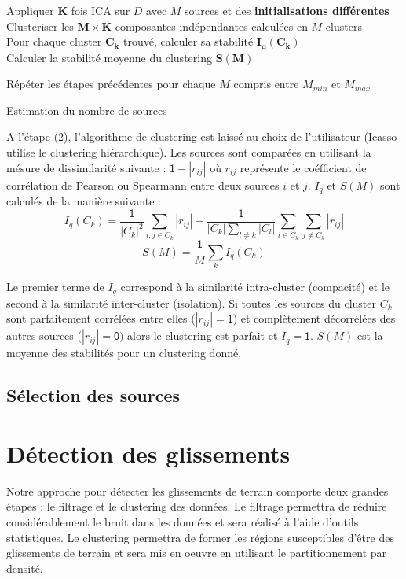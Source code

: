 \documentclass[11pt, openany]{report}
\begin{document}
\begin{algorithm}[H]
Appliquer $\boldsymbol{K}$ fois ICA sur $D$ avec $M$ sources et des \textbf{initialisations différentes} \\
Clusteriser les $\boldsymbol{M \times K}$ composantes indépendantes calculées en $M$ clusters\\
Pour chaque cluster $\boldsymbol{C_{k}}$ trouvé, calculer sa stabilité $\boldsymbol{I_{q}(C_{k})}$ \\
Calculer la stabilité moyenne du clustering $\boldsymbol{S(M)}$ \par
Répéter les étapes précédentes pour chaque $M$ compris entre $M_{min}$ et $M_{max}$
\caption{Estimation du nombre de sources}
\end{algorithm}
\newpage

 A l'étape (2), l'algorithme de clustering est laissé au choix de l'utilisateur (Icasso utilise le clustering hiérarchique). Les sources sont comparées en utilisant la mésure de dissimilarité suivante : $\mathsf{1} - |r_{ij}|$ où $r_{ij}$ représente le coéfficient de corrélation de Pearson ou Spearmann entre deux sources $i$ et $j$. $I_{q}$ et $S(M)$ sont calculés de la manière suivante :
\[ I_{q}(C_{k}) = \frac{\mathsf{1}}{|C_{k}|^2} \sum_{i, j \in C_{k}}|r_{ij}|  -  \frac{\mathsf{1}}{|C_{k}|\sum_{l \neq k}|C_{l}|} \sum_{i \in C_{k}}\sum_{j \neq C_{k}}|r_{ij}| \]
\[ S(M) = \frac{\mathsf{1}}{M}\sum_{k}I_{q}(C_{k}) \]

Le premier terme de $I_{q}$ correspond à la similarité intra-cluster (compacité) et le second à la similarité inter-cluster (isolation). Si toutes les sources du cluster $C_{k}$ sont parfaitement corrélées entre elles ($|r_{ij}| = \mathsf{1}$) et complètement décorrélées des autres sources ($|r_{ij}| = \mathsf{0})$ alors le clustering est parfait et $I_{q} = \mathsf{1}$. $S(M)$ est la moyenne des stabilités pour un clustering donné.

\section{Sélection des sources}


\chapter{Détection des glissements}
Notre approche pour détecter les glissements de terrain comporte deux grandes étapes : le filtrage et le clustering des données. Le filtrage permettra de réduire considérablement le bruit dans les données et sera réalisé à l'aide d'outils statistiques. Le clustering permettra de former les régions susceptibles d'être des glissements de terrain et sera mis en oeuvre en utilisant le partitionnement par densité.
\end{document}
